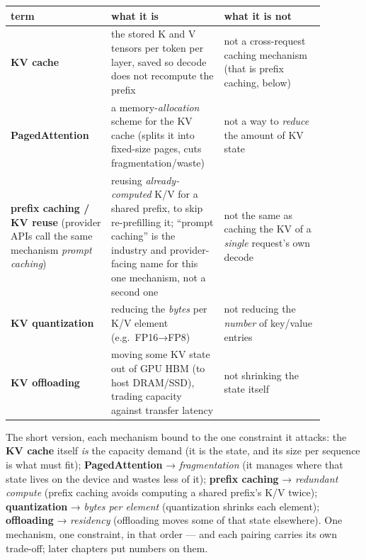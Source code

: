 \nopagebreak[4]
\begin{longtable}[]{@{}
  >{\raggedright\arraybackslash}p{0.2927\linewidth}
  >{\raggedright\arraybackslash}p{0.2927\linewidth}
  >{\raggedright\arraybackslash}p{0.2927\linewidth}@{}}
\toprule\noalign{}
\begin{minipage}[b]{\linewidth}\raggedright
term
\end{minipage} & \begin{minipage}[b]{\linewidth}\raggedright
what it is
\end{minipage} & \begin{minipage}[b]{\linewidth}\raggedright
what it is \textbf{not}
\end{minipage} \\
\midrule\noalign{}
\endhead
\bottomrule\noalign{}
\endlastfoot
\textbf{KV cache} & the stored K and V tensors per token per layer,
saved so decode does not recompute the prefix & not a cross-request
caching mechanism (that is prefix caching, below) \\
\noalign{\label{tab:2.3}}
\textbf{PagedAttention} & a memory-\emph{allocation} scheme for the KV
cache (splits it into fixed-size pages, cuts fragmentation/waste) & not
a way to \emph{reduce} the amount of KV state \\
\textbf{prefix caching / KV reuse} (provider APIs call the same
mechanism \emph{prompt caching}) & reusing \emph{already-computed} K/V
for a shared prefix, to skip re-prefilling it; ``prompt caching'' is the
industry and provider-facing name for this one mechanism, not a second
one & not the same as caching the KV of a \emph{single} request's own
decode \\
\textbf{KV quantization} & reducing the \emph{bytes} per K/V element
(e.g.~FP16→FP8) & not reducing the \emph{number} of key/value entries \\
\textbf{KV offloading} & moving some KV state out of GPU HBM (to host
DRAM/SSD), trading capacity against transfer latency & not shrinking the
state itself \\
\end{longtable}

The short version, each mechanism bound to the one constraint it
attacks: the \textbf{KV cache} itself \emph{is} the capacity demand (it
is the state, and its size per sequence is what must fit);
\textbf{PagedAttention} → \emph{fragmentation} (it manages where that
state lives on the device and wastes less of it); \textbf{prefix
caching} → \emph{redundant compute} (prefix caching avoids computing a
shared prefix's K/V twice); \textbf{quantization} → \emph{bytes per
element} (quantization shrinks each element); \textbf{offloading} →
\emph{residency} (offloading moves some of that state elsewhere). One
mechanism, one constraint, in that order --- and each pairing carries
its own trade-off; later chapters put numbers on them.


